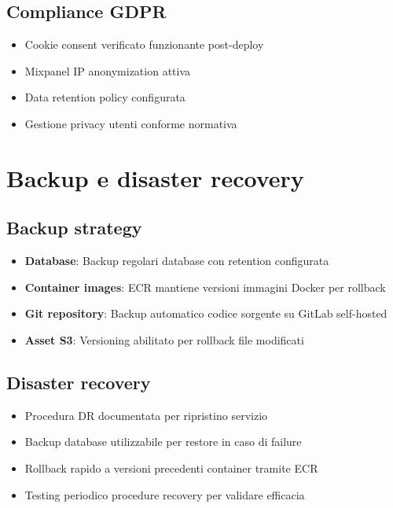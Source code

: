 \subsection{Compliance GDPR}
\begin{itemize}
  \item Cookie consent verificato funzionante post-deploy
  \item Mixpanel IP anonymization attiva
  \item Data retention policy configurata
  \item Gestione privacy utenti conforme normativa
\end{itemize}

\section{Backup e disaster recovery}

\subsection{Backup strategy}
\begin{itemize}
  \item \textbf{Database}: Backup regolari database con retention configurata
  \item \textbf{Container images}: ECR mantiene versioni immagini Docker per rollback
  \item \textbf{Git repository}: Backup automatico codice sorgente su GitLab self-hosted
  \item \textbf{Asset S3}: Versioning abilitato per rollback file modificati
\end{itemize}

\subsection{Disaster recovery}
\begin{itemize}
  \item Procedura DR documentata per ripristino servizio
  \item Backup database utilizzabile per restore in caso di failure
  \item Rollback rapido a versioni precedenti container tramite ECR
  \item Testing periodico procedure recovery per validare efficacia
\end{itemize}